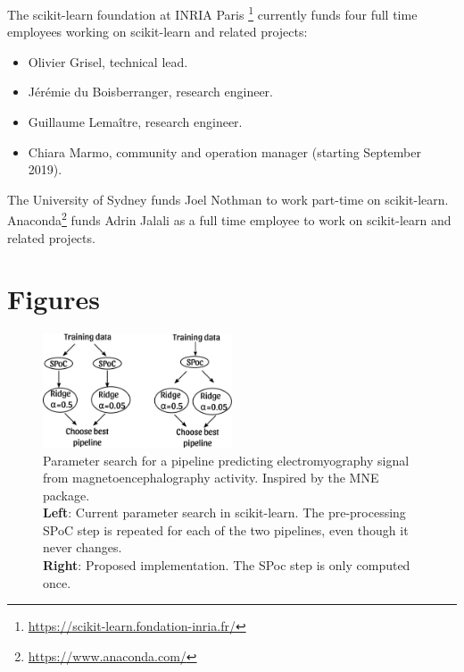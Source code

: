 \documentclass[11pt]{article}  %
\begin{document}
The scikit-learn foundation at INRIA Paris
\footnote{\href{https://scikit-learn.fondation-inria.fr/}{https://scikit-learn.fondation-inria.fr/}}
currently funds four full time employees working on scikit-learn and related
projects:
\begin{itemize}
\item Olivier Grisel, technical lead.
\item J\'er\'emie du Boisberranger, research engineer.
\item Guillaume Lema\^itre, research engineer.
\item Chiara Marmo, community and operation manager (starting September 2019).
\end{itemize}

The University of Sydney funds Joel Nothman to work part-time on
scikit-learn.
Anaconda\footnote{\href{https://www.anaconda.com/}{https://www.anaconda.com/}}
funds Adrin Jalali as a full time employee to work on scikit-learn and
related projects.

\clearpage
\section*{Figures}

\begin{figure}[h!]
  \centering
    \includegraphics[width=0.5\textwidth]{pipeline}
  \caption{
      Parameter search for a pipeline predicting electromyography signal
      from magnetoencephalography activity. Inspired by the MNE
      package\cite{MNE}.\\
      \textbf{Left}: Current parameter search in
      scikit-learn. The pre-processing SPoC step is repeated for each of the
      two pipelines, even though it never changes.\\
      \textbf{Right}: Proposed implementation. The SPoc step is only
      computed once.
      }
      \label{fig:fast_grid_search}
\end{figure}

\clearpage

\end{document}
